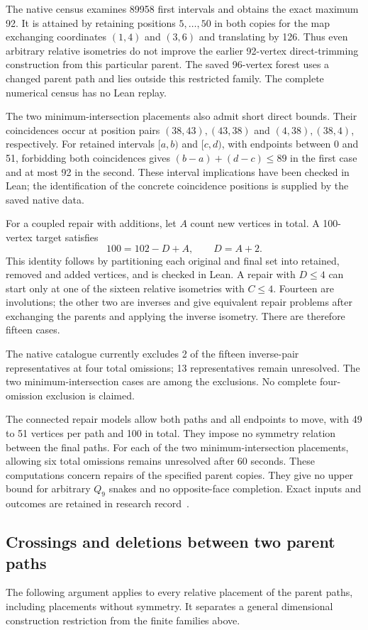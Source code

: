 \documentclass[11pt,a4paper]{article}
\theoremstyle{definition}
\theoremstyle{remark}
\begin{document}
The native census examines 89958 first intervals and obtains the exact
maximum 92. It is attained by retaining positions $5,\ldots,50$ in
both copies for the map exchanging coordinates $(1,4)$ and $(3,6)$
and translating by 126. Thus even arbitrary relative isometries do not
improve the earlier 92-vertex direct-trimming construction from this
particular parent. The saved 96-vertex forest uses a changed parent path
and lies outside this restricted family. The complete numerical census
has no Lean replay.

The two minimum-intersection placements also admit short direct bounds.
Their coincidences occur at position pairs $(38,43),(43,38)$ and
$(4,38),(38,4)$, respectively. For retained intervals $[a,b)$ and $[c,d)$,
with endpoints between 0 and 51, forbidding both coincidences gives
$(b-a)+(d-c)\le89$ in the first case and at most 92 in the second.
These interval implications have been checked in Lean; the identification
of the concrete coincidence positions is supplied by the saved native data.

For a coupled repair with additions, let $A$ count new vertices in total.
A 100-vertex target satisfies
\[
100=102-D+A,\qquad D=A+2.
\]
This identity follows by partitioning each original and final set into
retained, removed and added vertices, and is checked in Lean. A repair
with $D\le4$ can start only at one of the sixteen relative isometries
with $C\le4$. Fourteen are involutions; the other two are inverses and
give equivalent repair problems after exchanging the parents and
applying the inverse isometry. There are therefore fifteen cases.

The native catalogue currently excludes 2 of the fifteen inverse-pair representatives at four total omissions; 13 representatives remain unresolved. The two minimum-intersection cases are among the exclusions. No complete four-omission exclusion is claimed.

The connected repair models allow both paths and all endpoints to move,
with 49 to 51 vertices per path and 100 in total. They impose no symmetry
relation between the final paths. For each of the two minimum-intersection
placements, allowing six total omissions remains unresolved after
60 seconds. These computations concern repairs of the specified parent
copies. They give no upper bound for arbitrary $Q_9$ snakes and no
opposite-face completion. Exact inputs and outcomes are retained in
research record~\cite{research200}.


\subsection{Crossings and deletions between two parent paths}
\label{sec:crossing-deletion201}
The following argument applies to every relative placement of the parent
paths, including placements without symmetry. It separates a general
dimensional construction restriction from the finite families above.
\end{document}
